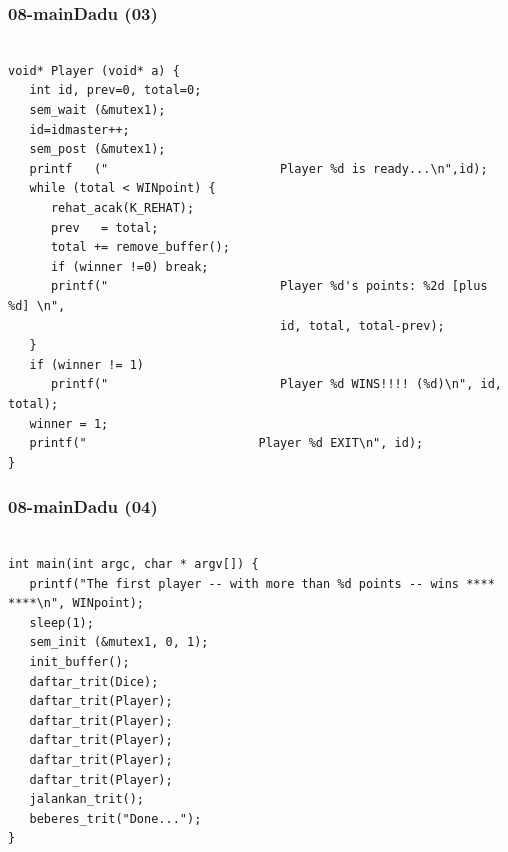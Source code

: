 \documentclass[xcolor=table, notheorems, hyperref={pdfpagelabels=false}]{beamer}
\begin{document}
\begin{frame}[fragile]
\frametitle{08-mainDadu (03)}
\begin{lstlisting}[basicstyle=\ttfamily\tiny]

void* Player (void* a) {
   int id, prev=0, total=0;
   sem_wait (&mutex1);
   id=idmaster++;
   sem_post (&mutex1);
   printf   ("                        Player %d is ready...\n",id);
   while (total < WINpoint) {
      rehat_acak(K_REHAT);
      prev   = total;
      total += remove_buffer();
      if (winner !=0) break;
      printf("                        Player %d's points: %2d [plus %d] \n", 
                                      id, total, total-prev);
   }
   if (winner != 1)
      printf("                        Player %d WINS!!!! (%d)\n", id, total);
   winner = 1;
   printf("                        Player %d EXIT\n", id);
}

\end{lstlisting}
\end{frame}

\begin{frame}[fragile]
\frametitle{08-mainDadu (04)}
\begin{lstlisting}[basicstyle=\ttfamily\tiny]

int main(int argc, char * argv[]) {
   printf("The first player -- with more than %d points -- wins **** ****\n", WINpoint);
   sleep(1);
   sem_init (&mutex1, 0, 1);
   init_buffer();
   daftar_trit(Dice);
   daftar_trit(Player);
   daftar_trit(Player);
   daftar_trit(Player);
   daftar_trit(Player);
   daftar_trit(Player);
   jalankan_trit();
   beberes_trit("Done...");
}


\end{lstlisting}
\end{frame}
\end{document}
